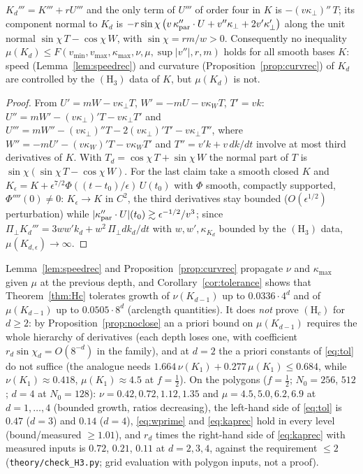\begin{proposition}\label{prop:noclose}
$K_d'''=K'''+rU'''$ and the only term of $U'''$ of order four in $K$ is $-(v\kappa_\perp)''\,T$; its component normal to $K_d$ is $-r\sin\chi\,\bigl(v\,\kappa_{\rm par}''\cdot U+v''\kappa_\perp+2v'\kappa_\perp'\bigr)$ along the unit normal $\sin\chi\,T-\cos\chi\,W$, with $\sin\chi=rm/w>0$. Consequently no inequality $\mu(K_d)\le F(v_{\min},v_{\max},\kappa_{\max},\nu,\mu,\sup|v''|,r,m)$ holds for all smooth bases $K$: speed (Lemma~\ref{lem:speedrec}) and curvature (Proposition~\ref{prop:curvrec}) of $K_d$ are controlled by the $(\mathrm H_3)$ data of $K$, but $\mu(K_d)$ is not.
\end{proposition}
\begin{proof}
From $U'=mW-v\kappa_\perp T$, $W'=-mU-v\kappa_WT$, $T'=vk$: $U''=mW'-(v\kappa_\perp)'T-v\kappa_\perp T'$ and $U'''=mW''-(v\kappa_\perp)''T-2(v\kappa_\perp)'T'-v\kappa_\perp T''$, where $W''=-mU'-(v\kappa_W)'T-v\kappa_WT'$ and $T''=v'k+v\,dk/dt$ involve at most third derivatives of $K$. With $T_d=\cos\chi\,T+\sin\chi\,W$ the normal part of $T$ is $\sin\chi(\sin\chi\,T-\cos\chi\,W)$. For the last claim take a smooth closed $K$ and $K_\epsilon=K+\epsilon^{7/2}\Phi((t-t_0)/\epsilon)\,U(t_0)$ with $\Phi$ smooth, compactly supported, $\Phi''''(0)\ne0$: $K_\epsilon\to K$ in $C^2$, the third derivatives stay bounded ($O(\epsilon^{1/2})$ perturbation) while $|\kappa_{\rm par}''\cdot U|(t_0)\gtrsim\epsilon^{-1/2}/v^3$; since $\Pi_\perp K_d'''=3ww'k_d+w^2\,\Pi_\perp dk_d/dt$ with $w,w',\kappa_{K_d}$ bounded by the $(\mathrm H_3)$ data, $\mu(K_{d,\epsilon})\to\infty$.
\end{proof}

\begin{remark}\label{rem:H3status}
Lemma~\ref{lem:speedrec} and Proposition~\ref{prop:curvrec} propagate $\nu$ and $\kappa_{\max}$ given $\mu$ at the previous depth, and Corollary~\ref{cor:tolerance} shows that Theorem~\ref{thm:Hc} tolerates growth of $\nu(K_{d-1})$ up to $0.0336\cdot4^d$ and of $\mu(K_{d-1})$ up to $0.0505\cdot8^d$ (arclength quantities). It does \emph{not} prove $(\mathrm H_c)$ for $d\ge2$: by Proposition~\ref{prop:noclose} an a priori bound on $\mu(K_{d-1})$ requires the whole hierarchy of derivatives (each depth loses one, with coefficient $r_d\sin\chi_d=O(8^{-d})$ in the family), and at $d=2$ the a priori constants of \eqref{eq:tol} do not suffice (the analogue needs $1.664\,\nu(K_1)+0.277\,\mu(K_1)\le0.684$, while $\nu(K_1)\approx0.418$, $\mu(K_1)\approx4.5$ at $f=\frac12$). On the polygons ($f=\frac12$; $N_0=256$, $512$; $d=4$ at $N_0=128$): $\nu=0.42,0.72,1.12,1.35$ and $\mu=4.5,5.0,6.2,6.9$ at $d=1,\dots,4$ (bounded growth, ratios decreasing), the left-hand side of \eqref{eq:tol} is $0.47$ ($d=3$) and $0.14$ ($d=4$), \eqref{eq:wprime} and \eqref{eq:kaprec} hold in every level (bound/measured $\ge1.01$), and $r_d$ times the right-hand side of \eqref{eq:kaprec} with measured inputs is $0.72$, $0.21$, $0.11$ at $d=2,3,4$, against the requirement $\le2$ (\texttt{theory/check\_H3.py}; grid evaluation with polygon inputs, not a proof).
\end{remark}
